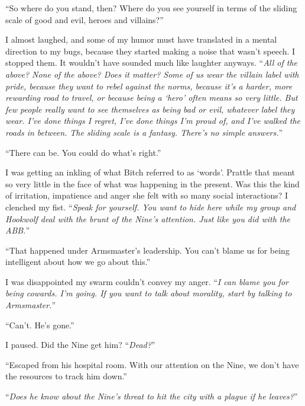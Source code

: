 ``So where do you stand, then?  Where do you see yourself in terms of the sliding scale of good and evil, heroes and villains?''



I almost laughed, and some of my humor must have translated in a mental direction to my bugs, because they started making a noise that wasn't speech.  I stopped them.  It wouldn't have sounded much like laughter anyways.  ``\emph{All of the above?  None of the above?  Does it matter?  Some of us wear the villain label with pride, because they want to rebel against the norms, because it's a harder, more rewarding road to travel, or because being a `hero' often means so very little.  But few people really want to see themselves as being bad or evil, whatever label they wear.  I've done things I regret, I've done things I'm proud of, and I've walked the roads in between.  The sliding scale is a fantasy.  There's no simple answers.}''

``There can be.  You could do what's right.''



I was getting an inkling of what Bitch referred to as `words'.  Prattle that meant so very little in the face of what was happening in the present.  Was this the kind of irritation, impatience and anger she felt with so many social interactions?  I clenched my fist. ``\emph{Speak for yourself.  You want to hide here while my group and Hookwolf deal with the brunt of the Nine's attention.  Just like you did with the ABB.}''



``That happened under Armsmaster's leadership.  You can't blame us for being intelligent about how we go about this.''



I was disappointed my swarm couldn't convey my anger.  ``\emph{I can blame you for being cowards.  I'm going.  If you want to talk about morality, start by talking to Armsmaster.}''



``Can't.  He's gone.''



I paused.  Did the Nine get him?  ``\emph{Dead?}''



``Escaped from his hospital room.  With our attention on the Nine, we don't have the resources to track him down.''



``\emph{Does he know about the Nine's threat to hit the city with a plague if he leaves?}''



